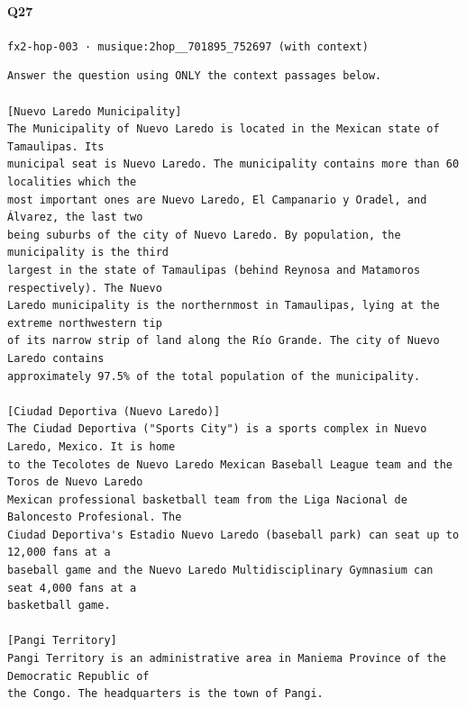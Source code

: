 \documentclass[10pt]{article}
\begin{document}
\paragraph{Q27} \texttt{fx2-hop-003  ·  musique:2hop\_\_701895\_752697 (with context)}
\begin{verbatim}
Answer the question using ONLY the context passages below.

[Nuevo Laredo Municipality]
The Municipality of Nuevo Laredo is located in the Mexican state of Tamaulipas. Its
municipal seat is Nuevo Laredo. The municipality contains more than 60 localities which the
most important ones are Nuevo Laredo, El Campanario y Oradel, and Álvarez, the last two
being suburbs of the city of Nuevo Laredo. By population, the municipality is the third
largest in the state of Tamaulipas (behind Reynosa and Matamoros respectively). The Nuevo
Laredo municipality is the northernmost in Tamaulipas, lying at the extreme northwestern tip
of its narrow strip of land along the Río Grande. The city of Nuevo Laredo contains
approximately 97.5% of the total population of the municipality.

[Ciudad Deportiva (Nuevo Laredo)]
The Ciudad Deportiva ("Sports City") is a sports complex in Nuevo Laredo, Mexico. It is home
to the Tecolotes de Nuevo Laredo Mexican Baseball League team and the Toros de Nuevo Laredo
Mexican professional basketball team from the Liga Nacional de Baloncesto Profesional. The
Ciudad Deportiva's Estadio Nuevo Laredo (baseball park) can seat up to 12,000 fans at a
baseball game and the Nuevo Laredo Multidisciplinary Gymnasium can seat 4,000 fans at a
basketball game.

[Pangi Territory]
Pangi Territory is an administrative area in Maniema Province of the Democratic Republic of
the Congo. The headquarters is the town of Pangi.


\end{verbatim}
\end{document}
